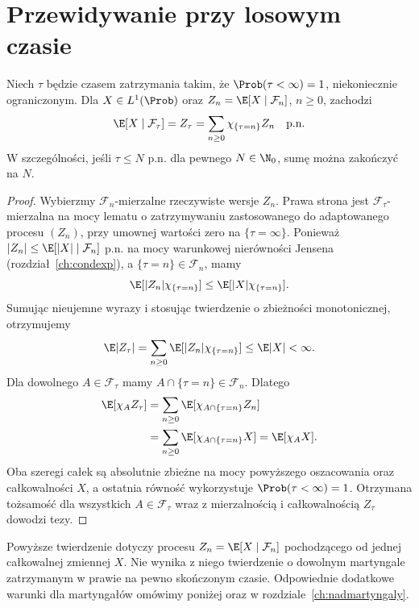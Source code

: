 \section{Przewidywanie przy losowym czasie}

\begin{twierdzenie}
\label{thm:rp1-13-stopped-condexp}
Niech $\tau$ będzie czasem zatrzymania takim,
że $\Prob(\tau<\infty)=1$, niekoniecznie
ograniczonym. Dla $X\in L^1(\Prob)$ oraz
$Z_n=\E[X\mid\mathcal F_n]$, $n\geq0$, zachodzi
\[
\E[X\mid\mathcal F_\tau]
=Z_\tau=\sum_{n\geq0}\chi_{\{\tau=n\}}Z_n
\quad\text{p.n.}
\]
W szczególności, jeśli $\tau\leq N$ p.n. dla
pewnego $N\in\N_0$, sumę można zakończyć na $N$.
\end{twierdzenie}
\begin{proof}
Wybierzmy $\mathcal F_n$-mierzalne rzeczywiste
wersje $Z_n$. Prawa strona jest
$\mathcal F_\tau$-mierzalna na mocy lematu
o zatrzymywaniu zastosowanego do adaptowanego
procesu $(Z_n)$, przy umownej wartości zero
na $\{\tau=\infty\}$.
Ponieważ $|Z_n|\leq\E[|X|\mid\mathcal F_n]$ p.n.
na mocy warunkowej nierówności Jensena
(rozdział~\ref{ch:condexp}), a
$\{\tau=n\}\in\mathcal F_n$, mamy
\[
\E[|Z_n|\chi_{\{\tau=n\}}]
\leq\E[|X|\chi_{\{\tau=n\}}].
\]
Sumując nieujemne wyrazy i stosując twierdzenie
o zbieżności monotonicznej, otrzymujemy
\[
\E|Z_\tau|
=\sum_{n\geq0}\E[|Z_n|\chi_{\{\tau=n\}}]
\leq\E|X|<\infty.
\]
Dla dowolnego $A\in\mathcal F_\tau$ mamy
$A\cap\{\tau=n\}\in\mathcal F_n$. Dlatego
\begin{align*}
\E[\chi_A Z_\tau]
&=\sum_{n\geq0}\E[\chi_{A\cap\{\tau=n\}}Z_n]\\
&=\sum_{n\geq0}\E[\chi_{A\cap\{\tau=n\}}X]
=\E[\chi_A X].
\end{align*}
Oba szeregi całek są absolutnie zbieżne
na mocy powyższego oszacowania oraz całkowalności
$X$, a ostatnia równość wykorzystuje
$\Prob(\tau<\infty)=1$. Otrzymana tożsamość
dla wszystkich $A\in\mathcal F_\tau$ wraz
z mierzalnością i całkowalnością $Z_\tau$
dowodzi tezy.
\end{proof}

\begin{uwaga}
Powyższe twierdzenie dotyczy procesu
$Z_n=\E[X\mid\mathcal F_n]$ pochodzącego
od jednej całkowalnej zmiennej $X$.
Nie wynika z niego twierdzenie o dowolnym
martyngale zatrzymanym w prawie na pewno
skończonym czasie. Odpowiednie dodatkowe warunki
dla martyngałów omówimy poniżej oraz w rozdziale~\ref{ch:nadmartyngaly}.
\end{uwaga}

